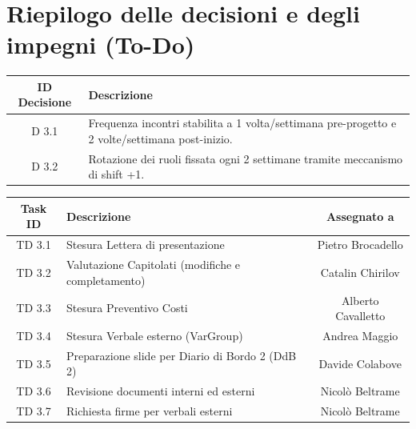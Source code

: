 \documentclass[a4paper, 11pt]{article}
\begin{document}
\newpage


\section{Riepilogo delle decisioni e degli impegni (To-Do)}

\begin{tabularx}{\textwidth}{|c|X|}
    \hline
    \textbf{ID Decisione} & \textbf{Descrizione} \\ \hline
    D 3.1 & Frequenza incontri stabilita a 1 volta/settimana pre-progetto e 2 volte/settimana post-inizio. \\ \hline
    D 3.2 & Rotazione dei ruoli fissata ogni 2 settimane tramite meccanismo di shift +1. \\ \hline
\end{tabularx}

\vspace{2cm}

\noindent
\begin{tabularx}{\textwidth}{|c|X|c|}
    \hline
    \textbf{Task ID} & \textbf{Descrizione} & \textbf{Assegnato a} \\ \hline
    TD 3.1 & Stesura Lettera di presentazione & Pietro Brocadello\\ \hline
    TD 3.2 & Valutazione Capitolati (modifiche e completamento) & Catalin Chirilov \\ \hline
    TD 3.3 & Stesura Preventivo Costi & Alberto Cavalletto\\ \hline
    TD 3.4 & Stesura Verbale esterno (VarGroup) & Andrea Maggio\\ \hline
    TD 3.5 & Preparazione slide per Diario di Bordo 2 (DdB 2) & Davide Colabove \\ \hline
    TD 3.6 & Revisione documenti interni ed esterni & Nicolò Beltrame\\ \hline
    TD 3.7 & Richiesta firme per verbali esterni & Nicolò Beltrame \\ \hline
\end{tabularx}
\end{document}
